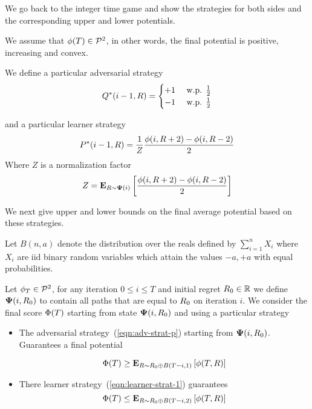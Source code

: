 \documentclass{article}[12pt]
\begin{document}
We go back to the integer time game and show the strategies for both
sides and the corresponding upper and lower potentials.

We assume that $\phi(T)  \in {\cal P}^{2}$, in other words, the final
potential is positive, increasing and convex.

We define a particular adversarial strategy
\begin{equation} \label{eqn:adv-strat-p}
  Q^*(i-1,R) =
  \begin{cases}
    +1 & \mbox{ w.p. } \frac{1}{2}\\
    -1 & \mbox{ w.p. } \frac{1}{2}\\
  \end{cases}
\end{equation}

and a particular learner strategy
\begin{equation} \label{eqn:learner-strat-1}
P^*(i-1,R) = \frac{1}{Z} \frac{\phi(i,R+2) - \phi(i,R-2)}{2}
\end{equation}
Where $Z$ is a normalization factor
$$Z = {\bf E}_{R \sim {\bf \Psi}(i)}\left[ \frac{\phi(i,R+2) - \phi(i,R-2)}{2} \right]$$

We next give upper and lower bounds on the final average potential
based on these strategies.

Let $B(n,a)$ denote the distribution over the reals defined by
$\sum_{i=1}^n X_i$ where $X_i$ are iid binary random variables which
attain the values $-a,+a$ with equal probabilities.

\begin{theorem} \label{thm:IntegerGameBounds}
  Let $\phi_T \in {\cal P}^{2}$, for any iteration $0 \leq i \leq T$ and
  initial regret $R_0 \in \mathbb{R}$ we define ${\bf \Psi}(i,R_0)$ to
  contain all paths that are equal to $R_0$ on iteration $i$. We
  consider the final score $\Phi(T)$ starting from state
  ${\bf \Psi}(i,R_0)$ and using a particular strategy
  \begin{itemize}
  \item
    The adversarial strategy~(\ref{eqn:adv-strat-p}) starting from
    ${\bf \Psi}(i,R_0)$. Guarantees a final potential 
     
    $$\Phi(T) \geq {\bf E}_{R \sim R_0 \oplus B(T-i,1)}\left[ \phi(T,R) \right]$$
  \item
    There learner strategy~(\ref{eqn:learner-strat-1}) guarantees 
    $$\Phi(T) \leq {\bf E}_{R \sim R_0 \oplus B(T-i,2)}\left[ \phi(T,R) \right]$$
  \end{itemize}
\end{theorem}
\end{document}
